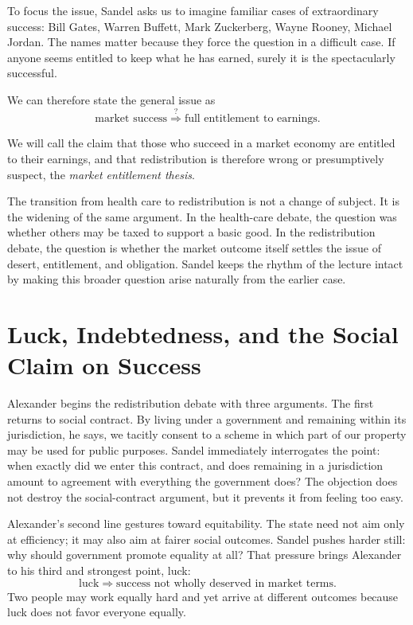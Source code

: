 To focus the issue, Sandel asks us to imagine familiar cases of extraordinary success: Bill Gates, Warren Buffett, Mark Zuckerberg, Wayne Rooney, Michael Jordan. The names matter because they force the question in a difficult case. If anyone seems entitled to keep what he has earned, surely it is the spectacularly successful.

We can therefore state the general issue as
\begin{equation}
\text{market success}
\stackrel{?}{\Longrightarrow}
\text{full entitlement to earnings}.
\end{equation}

\begin{definition}
We will call the claim that those who succeed in a market economy are entitled to their earnings, and that redistribution is therefore wrong or presumptively suspect, the \emph{market entitlement thesis}.
\end{definition}

The transition from health care to redistribution is not a change of subject. It is the widening of the same argument. In the health-care debate, the question was whether others may be taxed to support a basic good. In the redistribution debate, the question is whether the market outcome itself settles the issue of desert, entitlement, and obligation. Sandel keeps the rhythm of the lecture intact by making this broader question arise naturally from the earlier case.

\section{Luck, Indebtedness, and the Social Claim on Success}

Alexander begins the redistribution debate with three arguments. The first returns to social contract. By living under a government and remaining within its jurisdiction, he says, we tacitly consent to a scheme in which part of our property may be used for public purposes. Sandel immediately interrogates the point: when exactly did we enter this contract, and does remaining in a jurisdiction amount to agreement with everything the government does? The objection does not destroy the social-contract argument, but it prevents it from feeling too easy.

Alexander's second line gestures toward equitability. The state need not aim only at efficiency; it may also aim at fairer social outcomes. Sandel pushes harder still: why should government promote equality at all? That pressure brings Alexander to his third and strongest point, luck:
\begin{equation}
\text{luck}
\Longrightarrow
\text{success not wholly deserved in market terms}.
\end{equation}
Two people may work equally hard and yet arrive at different outcomes because luck does not favor everyone equally.

